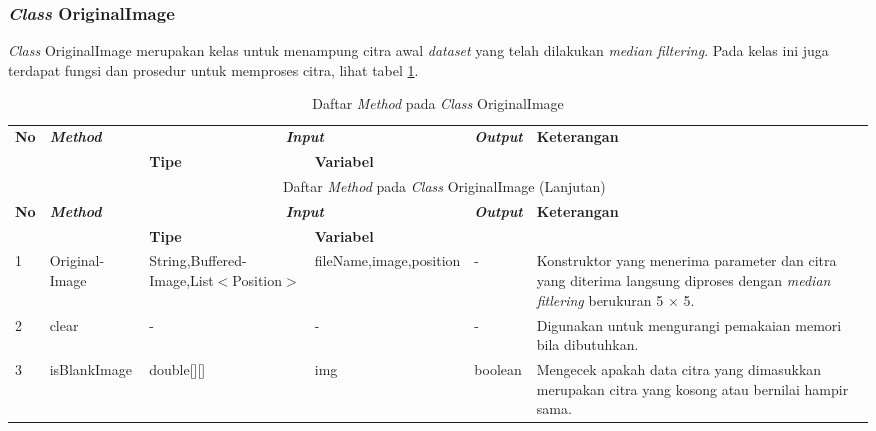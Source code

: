 \subsubsection{\textit{Class} OriginalImage}
\noindent \textit{Class} OriginalImage merupakan kelas untuk menampung citra awal \textit{dataset} yang telah dilakukan \textit{median filtering}. Pada kelas ini juga terdapat fungsi dan prosedur untuk memproses citra, lihat tabel \ref{tbl:classOriginalImage}.
\begingroup
\setlength{\LTleft}{-20cm plus -1fill}
\setlength{\LTright}{\LTleft}
\begin{small}
\begin{longtable}{|p{0.4cm}|p{2cm}|p{1.8cm}|p{1.8cm}|p{1.7cm}|p{3.55cm}|}
	\caption{Daftar \textit{Method} pada \textit{Class} OriginalImage \label{tbl:classOriginalImage}}\\
	\hline
	\multirow{2}{*}{\textbf{No}} & \multirow{2}{*}{\textit{\textbf{Method}}} & \multicolumn{2}{c|}{\textit{\textbf{Input}}} & \multirow{2}{*}{\textit{\textbf{Output}}} & 
	\multirow{2}{*}{\textbf{Keterangan}}\\
	\cline{3-4}
	& & \textbf{Tipe} & \textbf{Variabel} & & \\
	\endfirsthead
	\multicolumn{6}{c}{\textbf{\tablename~\thetable} Daftar \textit{Method} pada \textit{Class} OriginalImage (Lanjutan)} \\
	\hline
	\multirow{2}{*}{\textbf{No}} & \multirow{2}{*}{\textit{\textbf{Method}}} & \multicolumn{2}{c|}{\textit{\textbf{Input}}} & \multirow{2}{*}{\textit{\textbf{Output}}} & 
	\multirow{2}{*}{\textbf{Keterangan}}\\
	\cline{3-4}
	& & \textbf{Tipe} & \textbf{Variabel} & & \\
	\endhead
	\hline
	1 & Original-\newline Image & String,\newline Buffered-\newline Image,\newline List$<$\newline Position$>$ & fileName,\newline image,\newline position & - & Konstruktor yang menerima parameter dan citra yang diterima langsung diproses dengan \textit{median fitlering} berukuran 5 $\times$ 5.\\
	\hline
	2 & clear & - & - & - & Digunakan untuk mengurangi pemakaian memori bila dibutuhkan.\\
	\hline
	3 & isBlankImage & double[][] & img & boolean & Mengecek apakah data citra yang dimasukkan merupakan citra yang kosong atau bernilai hampir sama.\\

\end{longtable}
\end{small}
